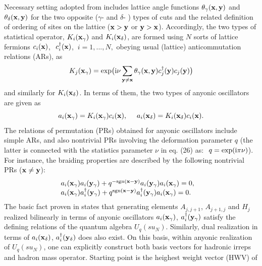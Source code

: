 \documentclass[twoside]{article}
\begin{document}
Necessary setting adopted from   \cite{ler-sci} includes
lattice angle functions $\theta_{\gamma}({\bf x},{\bf y})$ and
$\theta_{\delta}({\bf x},{\bf y})$ for the two opposite
($\gamma$- and $\delta$- ) types of cuts and the related definition
of ordering of sites on the lattice (${\bf x} > {\bf y}$ or
$ {\bf y} > {\bf x}$). Accordingly, the two types of statistical operator,
$K_i({\bf x}_{\gamma})$ and $K_i({\bf x}_{\delta})$,
are formed using $N$ sorts of lattice fermions
$c_i({\bf x})$, $\ c_i^{\dagger}({\bf x})$, $\ i=1,...,N,$
obeying usual (lattice) anticommutation relations (ARs), as
\begin{equation}
K_j({\bf x}_{\gamma})=
\exp\bigl( {\rm i} \nu
    \sum_{{\bf y}\ne{\bf x}}\theta_{\gamma}({\bf x},{\bf y})
c_j^{\dagger}({\bf y})c_j({\bf y}) \bigr)                 \label{(26)}
\end{equation}
and similarly for $K_i({\bf x}_{\delta})$.
In terms of them, the two types of
anyonic oscillators are given as   \cite{ler-sci}
\[
a_i({\bf x}_{\gamma})= K_i({\bf x}_{\gamma})c_i({\bf x}), \ \ \ \
a_i({\bf x}_{\delta})= K_i({\bf x}_{\delta})c_i({\bf x}).
\]
The relations of permutation (PRs) obtained for anyonic oscillators
include simple ARs, and also nontrivial PRs involving
the deformation parameter $q$ (the latter is connected with the
statistics parameter $\nu$ in eq. (26) as: $\ q=\exp({\rm i}\pi\nu)$).
For instance, the braiding properties are described by the following
nontrivial PRs (${\bf x}\ne {\bf y}$):
\[
\begin{array}{ll}
a_i({\bf x}_{\gamma})a_i({\bf y}_{\gamma})
+q^{-{\rm sgn}({\bf x}-{\bf y})}
a_i({\bf y}_{\gamma})a_i({\bf x}_{\gamma}) =0, & {}         \\
      a_i({\bf x}_{\gamma})a_i^{\dagger}({\bf y}_{\gamma})
       +q^{{\rm sgn}({\bf x}-{\bf y})}
          a_i^{\dagger}({\bf y}_{\gamma})a_i({\bf x}_{\gamma}) =0.
\end{array}
\]
The basic fact proven in  \cite{ler-sci} states that generating
elements $A_{j,j+1}$, $A_{j+1,j}$ and $H_j$ realized bilinearly
in terms of anyonic oscillators $a_i({\bf x}_{\gamma})$,
$a_i^{\dagger}({\bf y}_{\gamma})$ satisfy the defining
relations  \cite{dr-j,frt} of the quantum algebra $U_q(su_N)$.
Similarly, dual realization in terms of  $a_i({\bf x}_{\delta})$,
$a_i^{\dagger}({\bf y}_{\delta})$ does also exist. On this basis,
within anyonic realization of $U_q(su_N)$, one can
explicitly construct    \cite{ga-io2}  both basis vectors
for hadronic irreps and hadron mass operator.
Starting point is the heighest weight vector (HWV) of
\end{document}
